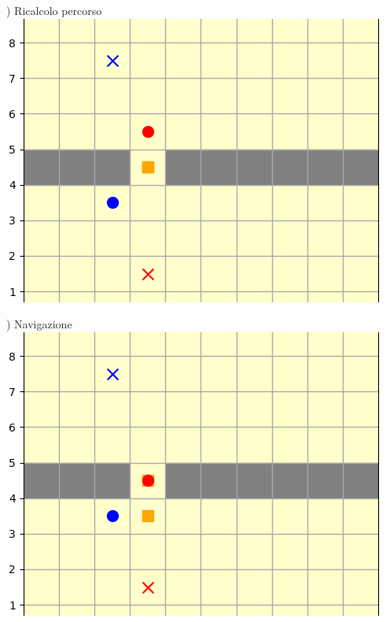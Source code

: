 \documentclass[12pt]{article}
\begin{document}
\noindent \begin{minipage}[ht]{0.45\linewidth}
) Ricalcolo percorso
\includegraphics[width=\textwidth]{SimulazioniNavigazione/2AGV_ConflittoWait/2t.png}
\end{minipage}
\begin{minipage}[ht]{0.45\linewidth}
) Navigazione
\includegraphics[width=\textwidth]{SimulazioniNavigazione/2AGV_ConflittoWait/3t.png}
\end{minipage}\\

\vspace{1cm}
\end{document}
